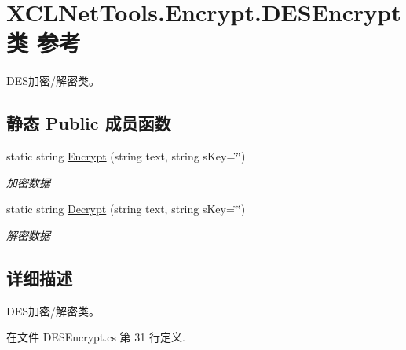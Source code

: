 \hypertarget{class_x_c_l_net_tools_1_1_encrypt_1_1_d_e_s_encrypt}{\section{X\-C\-L\-Net\-Tools.\-Encrypt.\-D\-E\-S\-Encrypt类 参考}
\label{class_x_c_l_net_tools_1_1_encrypt_1_1_d_e_s_encrypt}
}


D\-E\-S加密/解密类。  


\subsection*{静态 Public 成员函数}
\begin{DoxyCompactItemize}
\item 
static string \hyperlink{class_x_c_l_net_tools_1_1_encrypt_1_1_d_e_s_encrypt_a5bd946e26e2f43cc6b2d999df6b9d88d}{Encrypt} (string text, string s\-Key=\char`\"{}\char`\"{})
\begin{DoxyCompactList}\small\item\em 加密数据 \end{DoxyCompactList}\item 
static string \hyperlink{class_x_c_l_net_tools_1_1_encrypt_1_1_d_e_s_encrypt_a2455ab42f563bee03bf39c6f6eb9b2d1}{Decrypt} (string text, string s\-Key=\char`\"{}\char`\"{})
\begin{DoxyCompactList}\small\item\em 解密数据 \end{DoxyCompactList}\end{DoxyCompactItemize}


\subsection{详细描述}
D\-E\-S加密/解密类。 



在文件 D\-E\-S\-Encrypt.\-cs 第 31 行定义.



